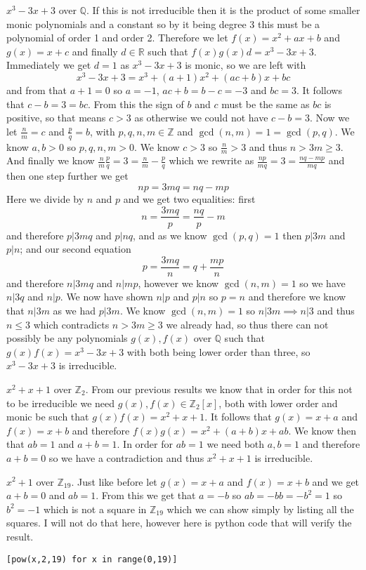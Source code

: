 \documentclass{article}
\begin{document}
 $x^3-3x+3$ over $\mathbb Q$. If this is not irreducible then it is the product of some smaller monic polynomials and a constant so by it being degree 3 this must be a polynomial of order 1 and order 2. Therefore we let $f(x) = x^2+ax+b$ and $g(x) = x+c$ and finally $d\in \mathbb R$ such that $f(x)g(x)d = x^3-3x+3$. Immediately we get $d=1$ as $x^3-3x+3$ is monic, so we are left with $$x^3-3x+3=x^3+(a+1)x^2+(ac+b)x+bc$$ and from that $a + 1 = 0$ so $a=-1$, $ac+b = b-c = -3$ and $bc =3$. It follows that $c-b=3=bc$. From this the sign of $b$ and $c$ must be the same as $bc$ is positive, so that means $c > 3$ as otherwise we could not have $c-b=3$. Now we let $\frac nm = c$ and $\frac pq = b$, with $p,q,n,m \in\mathbb Z$ and $\gcd(n,m) =1 = \gcd(p,q)$. We know $a,b > 0$ so $p,q,n,m>0$. We know $c>3$ so $\frac nm > 3$ and thus $n>3m\ge 3$. And finally we know $\frac nm\frac pq = 3 = \frac nm-\frac pq$ which we rewrite as $\frac{np}{mq} = 3 = \frac{nq-mp}{mq}$ and then one step further we get $$np=3mq=nq-mp$$ Here we divide by $n$ and $p$ and we get two equalities: first $$n=\frac{3mq}p=\frac{nq}p-m$$ and therefore $p|3mq$ and $p|nq$, and as we know $\gcd(p,q)=1$ then $p|3m$ and $p|n$; and our second equation $$p=\frac{3mq}n=q+\frac{mp}n$$ and therefore $n|3mq$ and $n|mp$, however we know $\gcd(n,m) = 1$ so we have $n|3q$ and $n|p$. We now have shown $n|p$ and $p|n$ so $p=n$ and therefore we know that $n|3m$ as we had $p|3m$. We know $\gcd(n,m)=1$ so $n|3m\implies n|3$ and thus $n \le 3$ which contradicts $n > 3m \ge 3$ we already had, so thus there can not possibly be any polynomials $g(x),f(x)$ over $\mathbb Q$ such that $g(x)f(x) = x^3-3x+3$ with both being lower order than three, so $x^3-3x+3$ is irreducible.

 $x^2+x+1$ over $\mathbb Z_2$. From our previous results we know that in order for this not to be irreducible we need $g(x),f(x)\in\mathbb Z_2[x]$, both with lower order and monic be such that $g(x)f(x) = x^2+x+1$. It follows that $g(x)=x+a$ and $f(x)= x+b$ and therefore $f(x)g(x) = x^2+(a+b)x+ab$. We know then that $ab=1$ and $a+b=1$. In order for $ab=1$ we need both $a,b = 1$ and therefore $a+b=0$ so we have a contradiction and thus $x^2+x+1$ is irreducible.

 $x^2+1$ over $\mathbb Z_{19}$. Just like before let $g(x) = x+a$ and $f(x) = x+b$ and we get $a+b=0$ and $ab = 1$. From this we get that $a=-b$ so $ab=-bb=-b^2=1$ so $b^2 = -1$ which is not a square in $\mathbb Z_{19}$ which we can show simply by listing all the squares. I will not do that here, however here is python code that will verify the result.
\begin{center}
	\verb|[pow(x,2,19) for x in range(0,19)]|
\end{center}
\end{document}
